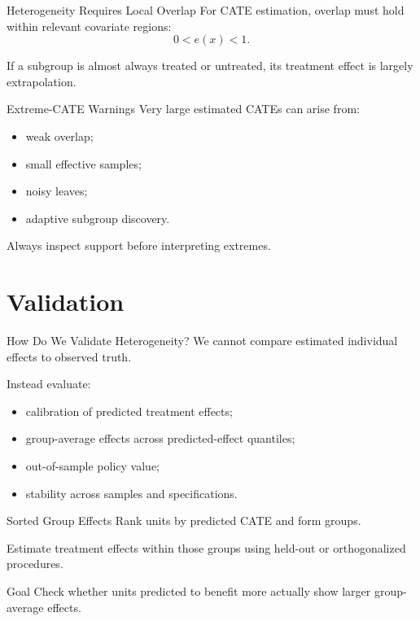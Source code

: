 \documentclass[aspectratio=169,11pt]{beamer}
\begin{document}
\begin{frame}{Heterogeneity Requires Local Overlap}
For CATE estimation, overlap must hold within relevant covariate regions:
\[
0<e(x)<1.
\]

If a subgroup is almost always treated or untreated, its treatment effect is largely extrapolation.
\end{frame}

\begin{frame}{Extreme-CATE Warnings}
Very large estimated CATEs can arise from:
\begin{itemize}
\item weak overlap;
\item small effective samples;
\item noisy leaves;
\item adaptive subgroup discovery.
\end{itemize}

Always inspect support before interpreting extremes.
\end{frame}

\section{Validation}

\begin{frame}{How Do We Validate Heterogeneity?}
We cannot compare estimated individual effects to observed truth.

Instead evaluate:
\begin{itemize}
\item calibration of predicted treatment effects;
\item group-average effects across predicted-effect quantiles;
\item out-of-sample policy value;
\item stability across samples and specifications.
\end{itemize}
\end{frame}

\begin{frame}{Sorted Group Effects}
Rank units by predicted CATE and form groups.

Estimate treatment effects within those groups using held-out or orthogonalized procedures.

\begin{block}{Goal}
Check whether units predicted to benefit more actually show larger group-average effects.
\end{block}
\end{frame}
\end{document}
